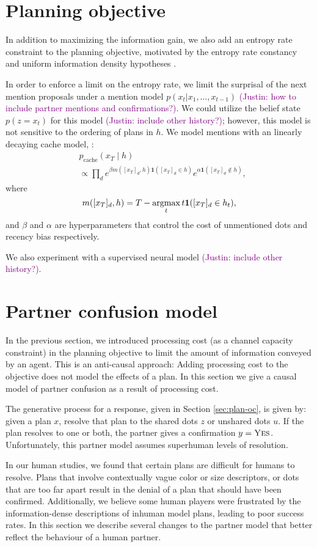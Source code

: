 \documentclass[11pt]{article}
\newcommand{\justin}[1]{{{\textcolor{purple}{(Justin: #1)}}}}
\begin{document}
\section{Planning objective}
In addition to maximizing the information gain,
we also add an entropy rate constraint to the planning objective,
motivated by the entropy rate constancy and uniform information density hypotheses \citep{erc,uid,ercdial}.

In order to enforce a limit on the entropy rate, 
we limit the surprisal of the next mention proposals
under a mention model $p(x_t | x_1,\ldots,x_{t-1})$ \justin{how to include partner mentions and confirmations?}.
We could utilize the belief state $p(z = x_t)$ for this model \justin{include other history?}; however, this model is not sensitive to the ordering of plans in $h$.
We model mentions with an linearly decaying cache model,
\citep{cache}:
\begin{align*}
&p_{\text{cache}}(x_T \mid h)\\
&\propto \prod_d e^{\beta m([x_T]_d,h)
    \mathbf{1}([x_T]_d\in h)
}
e^{\alpha\mathbf{1}([x_T]_d \notin h)},
\end{align*}
where
$$m([x_T]_d,h) = T - \operatorname*{argmax}_t t\mathbf1([x_T]_d \in h_t),$$
and $\beta$ and $\alpha$ are hyperparameters that control
the cost of unmentioned dots and recency bias respectively.

We also experiment with a supervised neural model \justin{include other history?}.

\section{Partner confusion model}
In the previous section, we introduced processing cost (as a channel capacity constraint) in the planning objective to limit the amount of information conveyed by an agent.
This is an anti-causal approach: Adding processing cost to the objective does not model the effects of a plan.
In this section we give a causal model of partner confusion as a result of processing cost.

The generative process for a response, given in Section \ref{sec:plan-oc}, is given by:
given a plan $x$, resolve that plan to the shared dots $z$ or unshared dots $u$. If the plan resolves to one or both, the partner gives a confirmation $y = \textsc{Yes}$.
Unfortunately, this partner model assumes superhuman levels of resolution.

In our human studies, we found that certain plans are difficult for humans to resolve. Plans that involve contextually vague color or size descriptors, or dots that are too far apart result in the denial of a plan that should have been confirmed.
Additionally, we believe some human players were frustrated by the information-dense descriptions of inhuman model plans, leading to poor success rates.
In this section we describe several changes to the partner model that better reflect the behaviour of a human partner.
\end{document}

